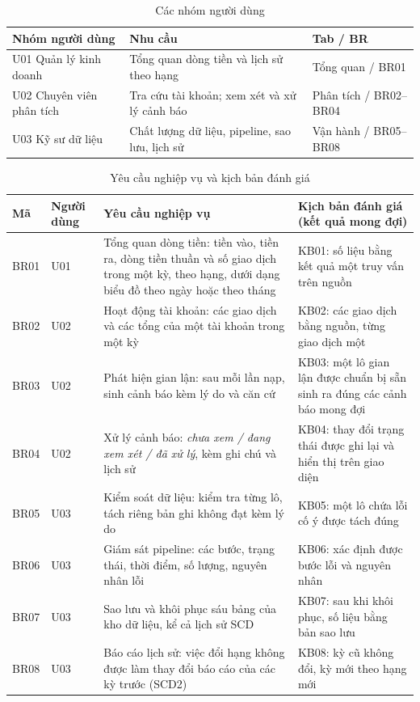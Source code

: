 \documentclass[peerreview]{IEEEtran}
\begin{document}
\begin{table}[!t]
\centering
\caption{Các nhóm người dùng}
\label{tab:usergroups}
\footnotesize
\setlength{\tabcolsep}{4pt}
\begin{tabular}{L{2.0cm} L{3.3cm} L{2.4cm}}
\toprule
\textbf{Nhóm người dùng} & \textbf{Nhu cầu} & \textbf{Tab / BR} \\
\midrule
U01 Quản lý kinh doanh & Tổng quan dòng tiền và lịch sử theo hạng & Tổng quan / BR01 \\
U02 Chuyên viên phân tích & Tra cứu tài khoản; xem xét và xử lý cảnh báo & Phân tích / BR02--BR04 \\
U03 Kỹ sư dữ liệu & Chất lượng dữ liệu, pipeline, sao lưu, lịch sử & Vận hành / BR05--BR08 \\
\bottomrule
\end{tabular}
\end{table}

\begin{table}[!t]
\centering
\caption{Yêu cầu nghiệp vụ và kịch bản đánh giá}
\label{tab:brs}
\small
\begin{tabular}{l l L{6.6cm} L{6.4cm}}
\toprule
\textbf{Mã} & \textbf{Người dùng} & \textbf{Yêu cầu nghiệp vụ} & \textbf{Kịch bản đánh giá (kết quả mong đợi)} \\
\midrule
BR01 & U01 & Tổng quan dòng tiền: tiền vào, tiền ra, dòng tiền thuần và số giao dịch trong một kỳ, theo hạng, dưới dạng biểu đồ theo ngày hoặc theo tháng & KB01: số liệu bằng kết quả một truy vấn trên nguồn \\
BR02 & U02 & Hoạt động tài khoản: các giao dịch và các tổng của một tài khoản trong một kỳ & KB02: các giao dịch bằng nguồn, từng giao dịch một \\
BR03 & U02 & Phát hiện gian lận: sau mỗi lần nạp, sinh cảnh báo kèm lý do và căn cứ & KB03: một lô gian lận được chuẩn bị sẵn sinh ra đúng các cảnh báo mong đợi \\
BR04 & U02 & Xử lý cảnh báo: \emph{chưa xem / đang xem xét / đã xử lý}, kèm ghi chú và lịch sử & KB04: thay đổi trạng thái được ghi lại và hiển thị trên giao diện \\
BR05 & U03 & Kiểm soát dữ liệu: kiểm tra từng lô, tách riêng bản ghi không đạt kèm lý do & KB05: một lô chứa lỗi cố ý được tách đúng \\
BR06 & U03 & Giám sát pipeline: các bước, trạng thái, thời điểm, số lượng, nguyên nhân lỗi & KB06: xác định được bước lỗi và nguyên nhân \\
BR07 & U03 & Sao lưu và khôi phục sáu bảng của kho dữ liệu, kể cả lịch sử SCD & KB07: sau khi khôi phục, số liệu bằng bản sao lưu \\
BR08 & U03 & Báo cáo lịch sử: việc đổi hạng không được làm thay đổi báo cáo của các kỳ trước (SCD2) & KB08: kỳ cũ không đổi, kỳ mới theo hạng mới \\
\bottomrule
\end{tabular}
\end{table}
\end{document}
